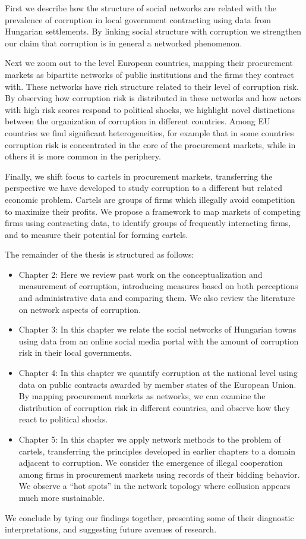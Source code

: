 First we describe how the structure of social networks are related with the prevalence of corruption in local government contracting using data from Hungarian settlements. By linking social structure with corruption we strengthen our claim that corruption is in general a networked phenomenon. 

Next we zoom out to the level European countries, mapping their procurement markets as bipartite networks of public institutions and the firms they contract with. These networks have rich structure related to their level of corruption risk. By observing how corruption risk is distributed in these networks and how actors with high risk scores respond to political shocks, we highlight novel distinctions between the organization of corruption in different countries. Among EU countries we find significant heterogeneities, for example that in some countries corruption risk is concentrated in the core of the procurement markets, while in others it is more common in the periphery. 

Finally, we shift focus to cartels in procurement markets, transferring the perspective we have developed to study corruption to a different but related economic problem. Cartels are groups of firms which illegally avoid competition to maximize their profits. We propose a framework to map markets of competing firms using contracting data, to identify groups of frequently interacting firms, and to measure their potential for forming cartels. 

The remainder of the thesis is structured as follows:
\begin{itemize}
\item Chapter 2: Here we review past work on the conceptualization and measurement of corruption, introducing measures based on both perceptions and administrative data and comparing them. We also review the literature on network aspects of corruption.
\item Chapter 3: In this chapter we relate the social networks of Hungarian towns using data from an online social media portal with the amount of corruption risk in their local governments.
\item Chapter 4: In this chapter we quantify corruption at the national level using data on public contracts awarded by member states of the European Union. By mapping procurement markets as networks, we can examine the distribution of corruption risk in different countries, and observe how they react to political shocks.
\item Chapter 5: In this chapter we apply network methods to the problem of cartels, transferring the principles developed in earlier chapters to a domain adjacent to corruption. We consider the emergence of illegal cooperation among firms in procurement markets using records of their bidding behavior. We observe a ``hot spots'' in the network topology where collusion appears much more sustainable.
\end{itemize}

We conclude by tying our findings together, presenting some of their diagnostic interpretations, and suggesting future avenues of research.